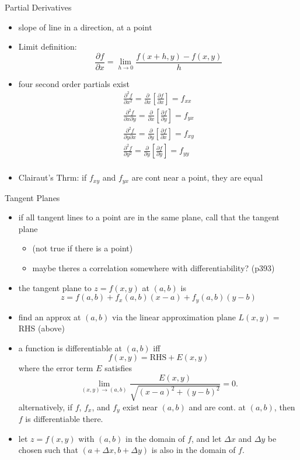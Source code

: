 \documentclass[11pt]{article}
\theoremstyle{definition}
\newcommand{\col}[1]{\begin{minipage}{\columnwidth}#1\end{minipage}}
\begin{document}
\begin{multicols}{2}
{    Partial Derivatives
    \begin{itemize}
      \item slope of line in a direction, at a point
      \item Limit definition:
      \[ \frac{\partial f}{\partial x} = \lim_{h\rightarrow 0}\frac{f(x+h,y)-f(x,y)}{h}\]
      \item four second order partials exist
      \begin{gather*}
        \frac{\partial^2 f}{\partial x^2} = \frac{\partial}{\partial x}\left[\frac{\partial f}{\partial x}\right] = f_{xx} \\
        \frac{\partial^2 f}{\partial x\partial y} = \frac{\partial}{\partial x}\left[\frac{\partial f}{\partial y}\right] = f_{yx} \\
        \frac{\partial^2 f}{\partial y\partial x} = \frac{\partial}{\partial y}\left[\frac{\partial f}{\partial x}\right] = f_{xy} \\
        \frac{\partial^2 f}{\partial y^2} = \frac{\partial}{\partial y}\left[\frac{\partial f}{\partial y}\right] = f_{yy} \\
      \end{gather*}
      \item Clairaut's Thrm: if $f_{xy}$ and $f_{yx}$ are cont near a point, they are equal
    \end{itemize}
  }
  \col{
    Tangent Planes
    \begin{itemize}
      \item if all tangent lines to a point are in the same plane, call that the tangent plane
      \begin{itemize}
        \item (not true if there is a point)
        \item maybe theres a correlation somewhere with differentiability? (p393)
      \end{itemize}
      \item the tangent plane to $z = f(x,y)$ at $(a,b)$ is 
      \[ z = f(a,b) + f_x(a,b)(x-a) + f_y(a,b)(y-b) \]
      \item find an approx at $(a,b)$ via the linear approximation plane $L(x,y) = $ RHS (above)
      \item a function is differentiable at $(a,b)$ iff
      \[ f(x,y) = \text{RHS} + E(x,y) \]
      where the error term $E$ satisfies
      \[ \lim_{(x,y)\rightarrow(a,b)}\frac{E(x,y)}{\sqrt{(x-a)^2+(y-b)^2}} = 0. \]
      alternatively, if $f$, $f_x$, and $f_y$ exist near $(a,b)$ and are cont. at $(a,b)$, then $f$ is differentiable there.
      \item let $z=f(x,y)$ with $(a,b)$ in the domain of $f$, and let $\Delta x$ and $\Delta y$ be chosen such that $(a+\Delta x,b+\Delta y)$ is also in the domain of $f$.
      

\end{itemize}}
\end{multicols}
\end{document}
